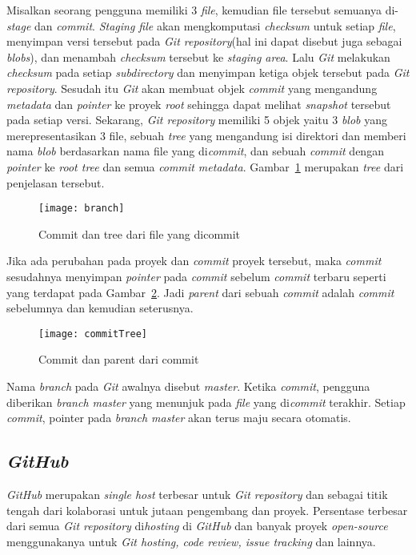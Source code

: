 Misalkan seorang pengguna memiliki 3 \textit{file}, kemudian file tersebut semuanya di-\textit{stage} dan \textit{commit}. \textit{Staging file} akan mengkomputasi \textit{checksum} untuk setiap \textit{file}, menyimpan versi tersebut pada \textit{Git repository}(hal ini dapat disebut juga sebagai \textit{blobs}), dan menambah \textit{checksum} tersebut ke \textit{staging area}. Lalu \textit{Git} melakukan \textit{checksum} pada setiap \textit{subdirectory} dan menyimpan ketiga objek tersebut pada \textit{Git repository}. Sesudah itu \textit{Git} akan membuat objek \textit{commit} yang mengandung \textit{metadata} dan \textit{pointer} ke proyek \textit{root} sehingga dapat melihat \textit{snapshot} tersebut pada setiap versi. Sekarang, \textit{Git repository} memiliki 5 objek yaitu 3 \textit{blob} yang merepresentasikan 3 file, sebuah \textit{tree} yang mengandung isi direktori dan memberi nama \textit{blob} berdasarkan nama file yang di\textit{commit}, dan sebuah \textit{commit} dengan \textit{pointer} ke \textit{root tree} dan semua \textit{commit metadata}. Gambar~\ref{fig:branch} merupakan \textit{tree} dari penjelasan tersebut.

\begin{figure}[H]
	\centering  
	\texttt{[image: branch]}  
	\caption[Commit dan tree dari file yang dicommit]{Commit dan tree dari file yang dicommit}
	\label{fig:branch} 
\end{figure}

Jika ada perubahan pada proyek dan \textit{commit} proyek tersebut, maka \textit{commit} sesudahnya menyimpan \textit{pointer} pada \textit{commit} sebelum \textit{commit} terbaru seperti yang terdapat pada Gambar~\ref{fig:commitTree}. Jadi \textit{parent} dari sebuah \textit{commit} adalah \textit{commit} sebelumnya dan kemudian seterusnya.

\begin{figure}[H]
	\centering  
	\texttt{[image: commitTree]}  
	\caption[Commit dan parent dari commit]{Commit dan parent dari commit}
	\label{fig:commitTree} 
\end{figure}

Nama \textit{branch} pada \textit{Git} awalnya disebut \textit{master}. Ketika \textit{commit}, pengguna diberikan \textit{branch master} yang menunjuk pada \textit{file} yang di\textit{commit} terakhir. Setiap \textit{commit}, pointer pada \textit{branch master} akan terus maju secara otomatis. 

\subsection{\textit{GitHub}}
\textit{GitHub} merupakan \textit{single host} terbesar untuk \textit{Git repository} dan sebagai titik tengah dari kolaborasi untuk jutaan pengembang dan proyek. Persentase terbesar dari semua \textit{Git repository} di\textit{hosting} di \textit{GitHub} dan banyak proyek \textit{open-source} menggunakanya untuk \textit{Git hosting, code review, issue tracking} dan lainnya. 

